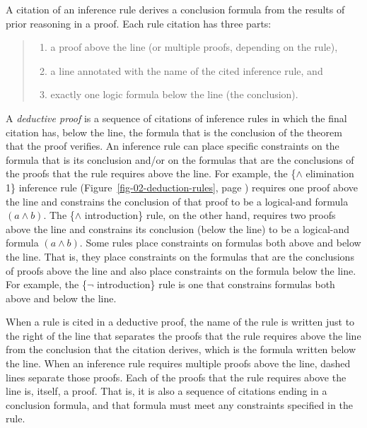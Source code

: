 A citation of an inference rule derives a conclusion formula
from the results of prior reasoning in a proof.
Each rule citation has three parts:
\begin{quote}
\begin{enumerate}
\item a proof above the line (or multiple proofs, depending on the rule),
\item a line annotated with the name of the cited inference rule, and
\item exactly one logic formula below the line (the conclusion).
\end{enumerate}
\end{quote}

\label{def-deductive-proof}
A \emph{deductive proof} is a sequence of citations of inference rules
in which the final citation has, below the line,
the formula that is the conclusion of the theorem that the proof verifies.
An inference rule can place specific constraints on the formula
that is its conclusion and/or on the formulas that are the
conclusions of the proofs that the rule requires above the line.
For example, the \{$\wedge$ elimination 1\} inference rule
(Figure~\ref{fig-02-deduction-rules}, page \pageref{fig-02-deduction-rules})
requires one proof above the line
and constrains the conclusion of that proof
to be a logical-and formula $(a \wedge b)$.
The \{$\wedge$ introduction\} rule, on the other hand,
requires two proofs above the line and
constrains its conclusion (below the line)
to be a logical-and formula $(a \wedge b)$.
Some rules place constraints on formulas both
above and below the line.
That is, they place constraints on the formulas
that are the conclusions of proofs above the line
and also place constraints
on the formula below the 
line.
For example, the \{$\neg$ introduction\} rule is one that
constrains formulas both above and below the line.

When a rule is cited in a deductive proof,
the name of the rule is written just to the right of
the line that separates the proofs that the rule requires above the line
from the conclusion that the citation derives,
which is the formula written below the line.
When an inference rule requires multiple proofs above the line,
dashed lines separate those proofs.
Each of the proofs that the rule requires above the line
is, itself, a proof.
That is, it is also a sequence of citations ending in a conclusion formula,
and that formula must meet any constraints
specified in the rule.

